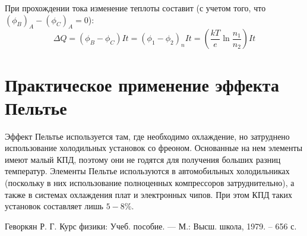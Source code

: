 \documentclass[a4paper, 12pt, openany]{book}
\begin{document}
	При прохождении тока изменение теплоты составит (с учетом того, что $(\phi_B)_A - (\phi_C)_A = 0$):
	\begin{equation}
	\Delta Q = (\phi_B - \phi_C) It = (\phi_1 - \phi_2)_n It = \left(\frac{kT}{e} \ln \frac{n_1}{n_2}\right) It
	\label{peEq}
	\end{equation} 
	\section{Практическое применение эффекта Пельтье}
	Эффект Пельтье используется там, где необходимо охлаждение, но затруднено использование холодильных установок со фреоном. Основанные на нем элементы имеют малый КПД, поэтому они не годятся для получения больших разниц температур. Элементы Пельтье используются в автомобильных холодильниках (поскольку в них использование полноценных компрессоров затруднительно), а также в системах охлаждения плат и электронных чипов. При этом КПД таких установок составляет лишь $5-8\%$.
	\begin{thebibliography}{1}
		 Геворкян Р. Г. Курс физики: Учеб. пособие. — М.: Высш. школа, 1979. -- 656 с.
	\end{thebibliography}
\end{document}
